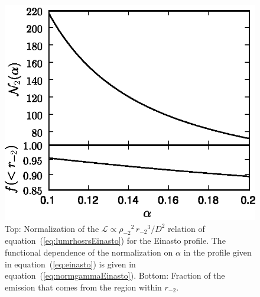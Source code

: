 \documentclass[aps,prd,twocolumn,amsmath,amssymb,floatfix,nofootinbib,10pt]{revtex4}
\newcommand{\eqnname}{equation}
\newcommand{\lum}{\ensuremath{\mathcal{L}}}
\newcommand{\dist}{\ensuremath{D}}
\newcommand{\rhominustwo}{\ensuremath{\rho_{-2}}}
\newcommand{\rminustwo}{\ensuremath{r_{-2}}}
\begin{document}
\begin{figure}[t]
\centering
\includegraphics{normgammaEinasto.eps}
\caption{Top: Normalization of the $\lum \propto \rhominustwo^2\,
\rminustwo^3/\dist^2$ relation of \eqnname\
(\ref{eq:lumrhosrsEinasto}) for the Einasto profile. The functional
dependence of the normalization on $\alpha$ in the profile given in
\eqnname\ (\ref{eq:einasto}) is given in \eqnname\
(\ref{eq:normgammaEinasto}). Bottom: Fraction of the emission that
comes from the region within \rminustwo.}%
\label{fig:normgammaEinasto}%
\end{figure}
\end{document}
